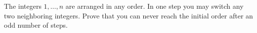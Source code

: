 The integers $1, \ldots, n$ are arranged in any order. In one step you may switch any two neighboring integers. Prove that you can never reach the initial order after an odd number of steps.
